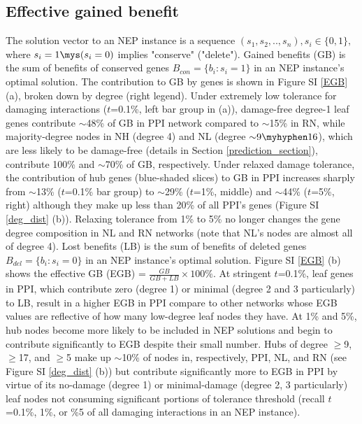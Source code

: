 	\subsection{Effective gained benefit}
			The solution vector to an NEP instance is a sequence $(s_1, s_2, .., s_n), s_i\in\{0,1\},$ where $s_i=1 \mys (s_i=0)$ implies "conserve" ("delete").
			Gained benefits (GB) is the sum of benefits of conserved genes $B_{con}=\{b_i: s_i=1\}$ in an NEP instance's optimal solution. The contribution to GB by genes is shown in Figure SI \ref{EGB} (a), broken down by degree (right legend). Under extremely low tolerance for damaging interactions ($t$=0.1\%, left bar group in (a)), damage-free degree-1 leaf genes contribute ${\sim}$48\% of GB in PPI network compared to ${\sim}$15\% in RN, while majority-degree nodes in NH (degree 4) and NL (degree ${\sim}9\myhyphen 16$), which are less likely to be damage-free (details in Section \ref{prediction_section}), contribute 100\% and  ${\sim}$70\% of GB, respectively. Under relaxed damage tolerance, the contribution of hub genes (blue-shaded slices) to GB in PPI increases sharply from
            ${\sim}$13\% ($t$=0.1\% bar group) to ${\sim}$29\% ($t$=1\%, middle) and ${\sim}$44\% ($t$=5\%, right) although they make up less than 20\% of all PPI's genes (Figure SI \ref{deg_dist} (b)). Relaxing tolerance from 1\% to 5\% no longer changes the gene degree composition in NL and RN networks (note that NL's nodes are almost all of degree 4). Lost benefits (LB) is the sum of benefits of deleted genes $B_{del}=\{b_i: s_i=0\}$ in an NEP instance's optimal solution. Figure SI \ref{EGB} (b) shows the effective GB (EGB) = ${\frac {GB}{GB+LB}}\times 100\%$.
			At stringent $t$=0.1\%, leaf genes in PPI, which contribute zero (degree 1) or minimal (degree 2 and 3 particularly) to LB, result in a higher EGB in PPI compare to other networks whose EGB values are reflective of how many low-degree leaf nodes they have. At 1\% and 5\%, hub nodes become more likely to be included in NEP solutions and begin to contribute significantly to EGB despite their small number. Hubs of degree $\geq$9, $\geq$17, and $\geq$5 make up ${\sim}$10\% of nodes in, respectively, PPI, NL, and RN (see Figure SI  \ref{deg_dist} (b)) but contribute significantly more to EGB in PPI by virtue of its no-damage (degree 1) or minimal-damage (degree 2, 3 particularly) leaf nodes not consuming significant portions of tolerance threshold (recall $t$=0.1\%, 1\%, or \%5 of all damaging interactions in an NEP  instance).


